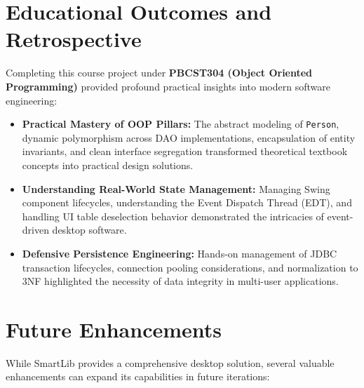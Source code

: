\section{Educational Outcomes and Retrospective}
Completing this course project under \textbf{PBCST304 (Object Oriented Programming)} provided profound practical insights into modern software engineering:
\begin{itemize}
    \item \textbf{Practical Mastery of OOP Pillars:} The abstract modeling of \texttt{Person}, dynamic polymorphism across DAO implementations, encapsulation of entity invariants, and clean interface segregation transformed theoretical textbook concepts into practical design solutions.
    \item \textbf{Understanding Real-World State Management:} Managing Swing component lifecycles, understanding the Event Dispatch Thread (EDT), and handling UI table deselection behavior demonstrated the intricacies of event-driven desktop software.
    \item \textbf{Defensive Persistence Engineering:} Hands-on management of JDBC transaction lifecycles, connection pooling considerations, and normalization to 3NF highlighted the necessity of data integrity in multi-user applications.
\end{itemize}

\section{Future Enhancements}
While SmartLib provides a comprehensive desktop solution, several valuable enhancements can expand its capabilities in future iterations:

